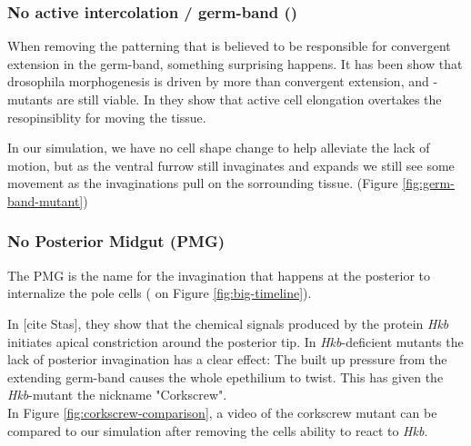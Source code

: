 

\subsubsection{No active intercolation / germ-band ()}
\label{sec:mutantNoGB}

When removing the patterning that is believed to be responsible for convergent extension in the germ-band, something surprising happens. It has been show that drosophila morphogenesis is driven by more than convergent extension, and -mutants are still viable. In  they show that active cell elongation overtakes the resopinsiblity for moving the tissue.

In our simulation, we have no cell shape change to help alleviate the lack of motion, but as the ventral furrow still invaginates and expands we still see some movement as the invaginations pull on the sorrounding tissue. (Figure \ref{fig:germ-band-mutant})



\subsubsection{No Posterior Midgut (PMG) }
The PMG is the name for the invagination that happens at the posterior to internalize the pole cells ( on Figure \ref{fig:big-timeline}).

In [cite Stas], they show that the chemical signals produced by the protein \textit{Hkb} initiates apical constriction around the posterior tip. In \textit{Hkb}-deficient mutants the lack of posterior invagination has a clear effect: The built up pressure from the extending germ-band causes the whole epethilium to twist. This has given the \textit{Hkb}-mutant the nickname "Corkscrew".\\

In Figure \ref{fig:corkscrew-comparison}, a video of the corkscrew mutant can be compared to our simulation after removing the cells ability to react to \textit{Hkb}.

